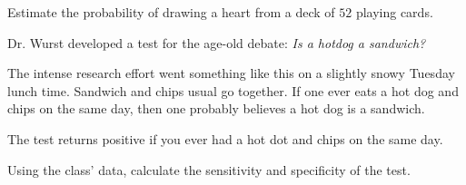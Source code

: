 \documentclass[../main.tex]{subfiles}
\begin{document}
\begin{example}
  Estimate the probability of drawing a heart from a deck of \(52\) playing cards.
\end{example}

\begin{example}
  Dr. Wurst developed a test for the age-old debate: \emph{Is a hotdog a sandwich?}

  The intense research effort went something like this on a slightly snowy Tuesday lunch time. Sandwich and chips usual go together. If one ever eats a hot dog and chips on the same day, then one probably believes a hot dog is a sandwich. 

  The test returns positive if you ever had a hot dot and chips on the same day. 

  Using the class' data, calculate the sensitivity and specificity of the test.

\end{example}
\end{document}
